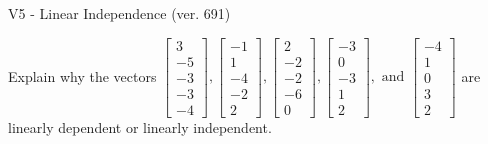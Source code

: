 \begin{exercise}
  \begin{exerciseTitle}V5 - Linear Independence (ver. 691)\end{exerciseTitle}
  \begin{exerciseStatement}
    Explain why the vectors \(\left[\begin{array}{r}
3 \\
-5 \\
-3 \\
-3 \\
-4
\end{array}\right] , \left[\begin{array}{r}
-1 \\
1 \\
-4 \\
-2 \\
2
\end{array}\right] , \left[\begin{array}{r}
2 \\
-2 \\
-2 \\
-6 \\
0
\end{array}\right] , \left[\begin{array}{r}
-3 \\
0 \\
-3 \\
1 \\
2
\end{array}\right] , \text{ and } \left[\begin{array}{r}
-4 \\
1 \\
0 \\
3 \\
2
\end{array}\right]\) are linearly dependent or linearly independent.	



\end{exerciseStatement}
\end{exercise}
